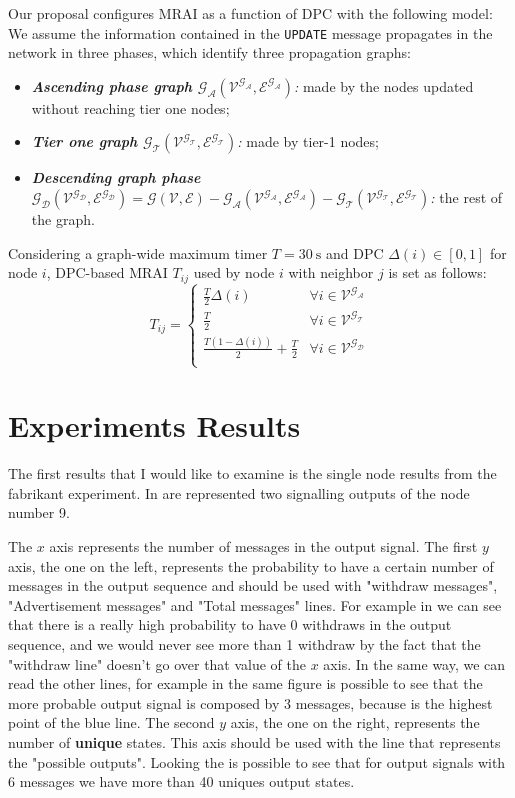 \documentclass[10pt,conference,letterpaper]{IEEEtran}
\newcommand{\update}{\texttt{UPDATE}\xspace}
\newcommand{\nodeset}{\ensuremath{\mathcal{V}}\xspace}
\newcommand{\edgeset}{\ensuremath{\mathcal{E}}\xspace}
\newcommand{\graph}{\ensuremath{\mathcal{G(\nodeset,\edgeset)}}\xspace}
\newcommand{\ascentg}{\ensuremath{\mathcal{G_{A}}\xspace}}
\newcommand{\ascentnodeset}{\ensuremath{\mathcal{V^{\ascentg}}}\xspace}
\newcommand{\ascentedgeset}{\ensuremath{\mathcal{E^{\ascentg}}}\xspace}
\newcommand{\ascentgraph}{\ensuremath{\mathcal{\ascentg(\ascentnodeset,\ascentedgeset)}}\xspace}
\newcommand{\dpc}{\ensuremath{\Delta}\xspace}
\newcommand{\tierg}{\ensuremath{\mathcal{G_{T}}\xspace}}
\newcommand{\tiernodeset}{\ensuremath{\mathcal{V^{\tierg}}}\xspace}
\newcommand{\tieredgeset}{\ensuremath{\mathcal{E^{\tierg}}}\xspace}
\newcommand{\tiergraph}{\ensuremath{\mathcal{\tierg(\tiernodeset,\tieredgeset)}}\xspace}
\newcommand{\descentg}{\ensuremath{\mathcal{G_{D}}\xspace}}
\newcommand{\descentnodeset}{\ensuremath{\mathcal{V^{\descentg}}}\xspace}
\newcommand{\descentedgeset}{\ensuremath{\mathcal{E^{\descentg}}}\xspace}
\newcommand{\descentgraph}{\ensuremath{\mathcal{\descentg(\descentnodeset,\descentedgeset)}}\xspace}
\begin{document}
Our proposal configures \ac{MRAI} as a function of \ac{DPC} with the following 
model: We assume the information contained in the \update message propagates in 
the network in three phases, which identify three propagation graphs:
\begin{itemize}
    \item \textit{\textbf{Ascending phase graph \ascentgraph}:} made by the 
		nodes updated without reaching tier one nodes;
    \item \textit{\textbf{Tier one graph \tiergraph}:} made by tier-1 nodes;
    \item \textit{\textbf{Descending graph phase $\descentgraph = \graph - \ascentgraph - \tiergraph$}:} 
		the rest of the graph.
\end{itemize}

Considering a graph-wide maximum timer $T=\SI{30}{\second}$ and \ac{DPC} 
$\dpc(i) \in [0,1]$ for node $i$, DPC-based \ac{MRAI} $T_{ij}$ used by node $i$ 
with neighbor $j$ is set as follows:
\begin{equation}
    T_{ij}=
    \begin{cases}
		\frac{T}{2}\dpc(i) & \forall i\in \ascentnodeset  \\
    \frac{T}{2} & \forall i\in \tiernodeset \\
		\frac{T(1-\dpc(i))}{2}+\frac{T}{2} & \forall i\in \descentnodeset\\
    \end{cases}
\end{equation} 

\section{Experiments Results}
\label{sec:results}

The first results that I would like to examine is the single node
results from the fabrikant experiment.
In  are represented
two signalling outputs of the node number \num{9}.

The $x$ axis represents the number of messages in the output signal.
The first $y$ axis, the one on the left, represents the probability to have a certain
number of messages in the output sequence and should be used with "withdraw
messages", "Advertisement messages" and "Total messages" lines.
For example in  we can see that there is a really
high probability to have \num{0} withdraws in the output sequence, and we would never
see more than 1 withdraw by the fact that the "withdraw line" doesn't go over that
value of the $x$ axis.
In the same way, we can read the other lines, for example in the same figure is
possible to see that the more probable output signal is composed by \num{3} messages,
because is the highest point of the blue line.
The second $y$ axis, the one on the right, represents the number of \textbf{unique}
states.
This axis should be used with the line that represents the "possible outputs".
Looking the  is possible to see that for
output signals with \num{6} messages we have more than \num{40} uniques output
states.
\end{document}

